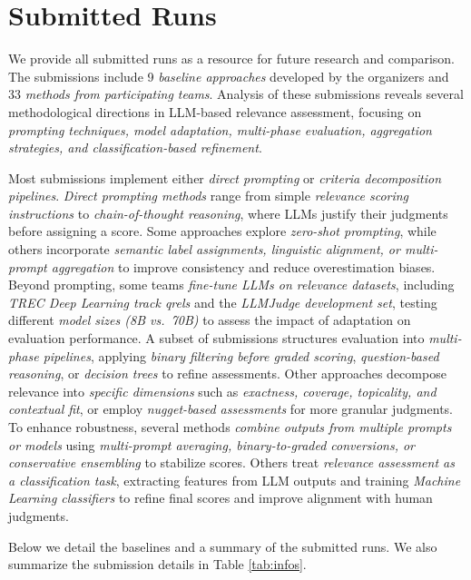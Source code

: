 \section{Submitted Runs}
\label{sec:intro-methods}
We provide all submitted runs as a resource for future research and comparison. The submissions include 9 \emph{baseline approaches} developed by the organizers and 33 \emph{methods from participating teams}. Analysis of these submissions reveals several methodological directions in \ac{LLM}-based relevance assessment, focusing on \emph{prompting techniques, model adaptation, multi-phase evaluation, aggregation strategies, and classification-based refinement}.  



Most submissions implement either \emph{direct prompting} or \emph{criteria decomposition pipelines}. \emph{Direct prompting methods} range from simple \emph{relevance scoring instructions} to \emph{chain-of-thought reasoning}, where \acp{LLM} justify their judgments before assigning a score. Some approaches explore \emph{zero-shot prompting}, while others incorporate \emph{semantic label assignments, linguistic alignment, or multi-prompt aggregation} to improve consistency and reduce overestimation biases.  
Beyond prompting, some teams \emph{fine-tune LLMs on relevance datasets}, including \emph{TREC Deep Learning track qrels} and the \emph{LLMJudge development set}, testing different \emph{model sizes (8B vs.~70B)} to assess the impact of adaptation on evaluation performance.  
A subset of submissions structures evaluation into \emph{multi-phase pipelines}, applying \emph{binary filtering before graded scoring}, \emph{question-based reasoning}, or \emph{decision trees} to refine assessments. Other approaches decompose relevance into \emph{specific dimensions} such as \emph{exactness, coverage, topicality, and contextual fit}, or employ \emph{nugget-based assessments} for more granular judgments.  
To enhance robustness, several methods \emph{combine outputs from multiple prompts or models} using \emph{multi-prompt averaging, binary-to-graded conversions, or conservative ensembling} to stabilize scores. Others treat \emph{relevance assessment as a classification task}, extracting features from LLM outputs and training \emph{Machine Learning classifiers} to refine final scores and improve alignment with human judgments.  

Below we detail the baselines and a summary of the submitted runs. We also summarize the submission details in Table \ref{tab:infos}.

